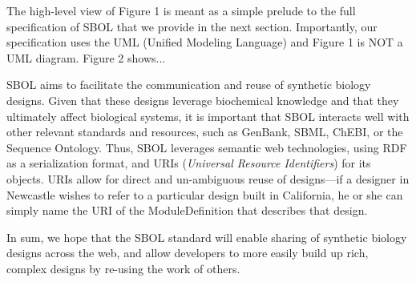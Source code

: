 The high-level view of Figure 1 is meant as a simple prelude to the full specification of SBOL that we provide in the next section. Importantly, our specification uses the UML (Unified Modeling Language) and Figure 1 is NOT a UML diagram. Figure 2 shows... 

SBOL aims to facilitate the communication and reuse of synthetic biology designs. Given that these designs leverage biochemical knowledge and that they ultimately affect biological systems, it is important that SBOL interacts well with other relevant standards and resources, such as GenBank, SBML, ChEBI, or the Sequence Ontology. Thus, SBOL leverages semantic web technologies, using RDF as a serialization format, and URIs (\emph{Universal Resource Identifiers}) for its objects. URIs allow for direct and un-ambiguous reuse of designs---if a designer in Newcastle wishes to refer to a particular design built in California, he or she can simply name the URI of the ModuleDefinition that describes that design. 

In sum, we hope that the SBOL standard will enable sharing of synthetic biology designs across the web, and allow developers to more easily build up rich, complex designs by re-using the work of others. 







